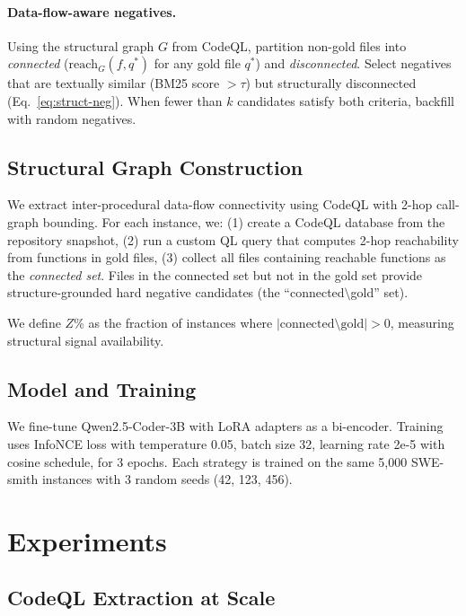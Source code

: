 \documentclass[11pt,a4paper]{article}
\begin{document}
\paragraph{Data-flow-aware negatives.} Using the structural graph $G$ from CodeQL, partition non-gold files into \emph{connected} ($\text{reach}_G(f, q^*)$ for any gold file $q^*$) and \emph{disconnected}.
Select negatives that are textually similar (BM25 score $> \tau$) but structurally disconnected (Eq.~\ref{eq:struct-neg}).
When fewer than $k$ candidates satisfy both criteria, backfill with random negatives.

\subsection{Structural Graph Construction}

We extract inter-procedural data-flow connectivity using CodeQL with 2-hop call-graph bounding.
For each instance, we:
(1) create a CodeQL database from the repository snapshot,
(2) run a custom QL query that computes 2-hop reachability from functions in gold files,
(3) collect all files containing reachable functions as the \emph{connected set}.
Files in the connected set but not in the gold set provide structure-grounded hard negative candidates (the ``connected$\setminus$gold'' set).

We define $Z\%$ as the fraction of instances where $|\text{connected} \setminus \text{gold}| > 0$, measuring structural signal availability.

\subsection{Model and Training}

We fine-tune Qwen2.5-Coder-3B with LoRA adapters as a bi-encoder.
Training uses InfoNCE loss with temperature 0.05, batch size 32, learning rate 2e-5 with cosine schedule, for 3 epochs.
Each strategy is trained on the same 5,000 SWE-smith instances with 3 random seeds (42, 123, 456).

\section{Experiments}

\subsection{CodeQL Extraction at Scale}
\label{sec:scalability}
\end{document}
